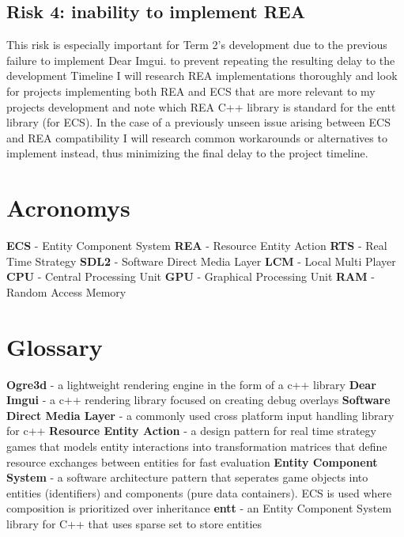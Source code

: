 \documentclass{article}
\begin{document}
\subsection{Risk 4: inability to implement REA}
This risk is especially important for Term 2's development due to the previous failure to implement Dear Imgui. to prevent repeating the resulting delay to the development Timeline I will research REA implementations thoroughly and look for projects implementing both REA and ECS that are more relevant to my projects development and note which REA C++ library is standard for the entt library (for ECS). In the case of a previously unseen issue arising between ECS and REA compatibility I will research common workarounds or alternatives to implement instead, thus minimizing the final delay to the project timeline.
\newpage
\section{Acronomys}

\textbf{ECS} 
- Entity Component System \newline
\textbf{REA} 
- Resource Entity Action \newline
\textbf{RTS} 
- Real Time Strategy \newline
\textbf{SDL2} 
- Software Direct Media Layer \newline
\textbf{LCM} 
- Local Multi Player \newline
\textbf{CPU} 
- Central Processing Unit \newline
\textbf{GPU} 
- Graphical Processing Unit \newline
\textbf{RAM} 
- Random Access Memory \newline
\newpage
\section{Glossary}
\textbf{Ogre3d}
- a lightweight rendering engine in the form of a c++ library \newline
\textbf{Dear Imgui}
- a c++ rendering library focused on creating debug overlays \newline
\textbf{Software Direct Media Layer}
- a commonly used cross platform input handling library for c++ \newline
\textbf{Resource Entity Action}
- a design pattern for real time strategy games that models entity interactions into transformation matrices that define resource exchanges between entities for fast evaluation \newline
\textbf{Entity Component System}
- a software architecture pattern that seperates game objects into entities (identifiers) and components (pure data containers). ECS is used where composition is prioritized over inheritance \newline
\textbf{entt}
- an Entity Component System library for C++ that uses sparse set to store entities \newline

\newpage
\end{document}
